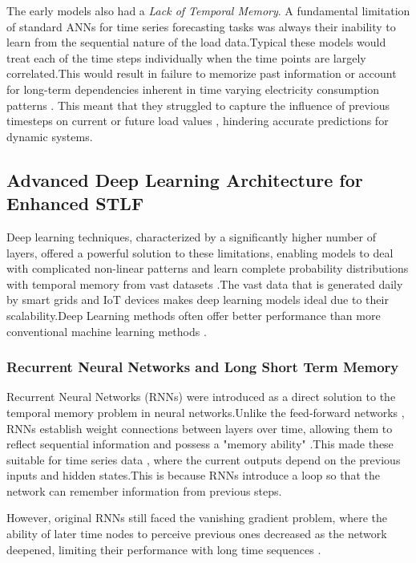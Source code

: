  The early models also had a \textit{Lack of Temporal Memory}. A fundamental limitation of standard ANNs for time series forecasting tasks was always their inability to learn from the sequential nature of the load data.Typical these models would treat each of the time steps individually when the time points are largely correlated.This would result in failure to memorize past information or account for long-term dependencies inherent in time varying electricity consumption patterns \cite{wang2023short}. This meant that they struggled to capture the influence of previous timesteps on current or future load values , hindering accurate predictions for dynamic systems.
 
 \subsection{Advanced Deep Learning Architecture for Enhanced STLF}
 
 Deep learning techniques, characterized by a significantly higher number of layers, offered a powerful solution to these limitations, enabling models to deal with complicated non-linear patterns and learn complete probability distributions with temporal memory from vast datasets \cite{tshipata2024multi}.The vast data that is generated daily by smart grids and IoT devices makes deep learning models ideal due to their scalability.Deep Learning methods often offer better performance than more conventional machine learning methods \cite{ibrahim2022machine}.
 
 \subsubsection{Recurrent Neural Networks and Long Short Term Memory}
 
 Recurrent Neural Networks (RNNs) were introduced as a direct solution to the temporal memory problem in neural networks.Unlike the feed-forward networks  , RNNs establish weight connections between layers over time, allowing them to reflect sequential information and possess a "memory ability" \cite{wang2018short}.This made these suitable for time series data , where the current outputs depend on the previous inputs and hidden states.This is because RNNs introduce a loop so that the network can remember information from previous steps.
 
 However, original RNNs still faced the vanishing gradient problem, where the ability of later time nodes to perceive previous ones decreased as the network deepened, limiting their performance with long time sequences \cite{wang2018short}.
 
